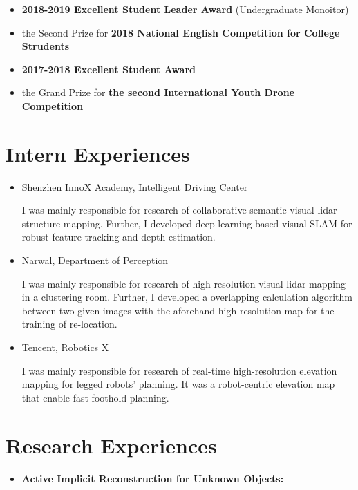 \documentclass[11pt,a4paper,sans]{moderncv}        %
\begin{document}
{\begin{itemize}
\item {\textbf{2018-2019 Excellent Student Leader Award} (Undergraduate Monoitor)}

\item{the Second Prize for \textbf{2018 National English Competition for College Strudents}}
\item {\textbf{2017-2018 Excellent Student Award}}

\item{the Grand Prize for \textbf{the second International Youth Drone Competition}}

\end{itemize}

\section{Intern Experiences}

\begin{itemize}

\item{Shenzhen InnoX Academy, Intelligent Driving Center

I was mainly responsible for research of collaborative semantic visual-lidar structure mapping. Further, I developed deep-learning-based visual SLAM for robust feature tracking and depth estimation.}

\item{Narwal, Department of Perception

I was mainly responsible for research of high-resolution visual-lidar mapping in a clustering room. Further, I developed a overlapping calculation algorithm between two given images with the aforehand high-resolution map for the training of re-location.}

\item{Tencent, Robotics X

I was mainly responsible for research of real-time high-resolution elevation mapping for legged robots' planning. It was a robot-centric elevation map that enable fast foothold planning.
}

\end{itemize}

\section{Research Experiences}

\begin{itemize}

    \item \textbf{Active Implicit Reconstruction for Unknown Objects:} 


\end{itemize}}
\end{document}
